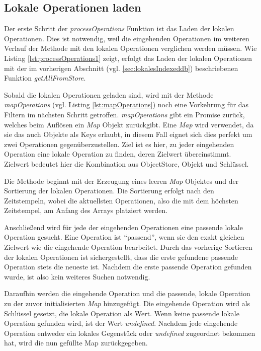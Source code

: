 \documentclass[a4paper, 12pt]{scrreprt}
\begin{document}
\subsection{Lokale Operationen laden}

Der erste Schritt der \textit{processOperations} Funktion ist das Laden der lokalen Operationen. Dies ist notwendig, weil die eingehenden Operationen im weiteren Verlauf der Methode mit den lokalen Operationen verglichen werden müssen. Wie Listing \ref{lst:processOperations1} zeigt, erfolgt das Laden der lokalen Operationen mit der im vorherigen Abschnitt (vgl. \ref{sec:lokalesIndexeddb}) beschriebenen Funktion \textit{getAllFromStore}.

\begin{minipage}{\linewidth}
	
\end{minipage}

Sobald die lokalen Operationen geladen sind, wird mit der Methode \textit{mapOperations} (vgl. Listing \ref{lst:mapOperations}) noch eine Vorkehrung für das Filtern im nächsten Schritt getroffen. \textit{mapOperations} gibt ein Promise zurück, welches beim Auflösen ein \textit{Map} Objekt zurückgibt. Eine \textit{Map} wird verwendet, da sie das auch Objekte als Keys erlaubt, in diesem Fall eignet sich dies perfekt um zwei Operationen gegenüberzustellen. Ziel ist es hier, zu jeder eingehenden Operation eine lokale Operation zu finden, deren Zielwert übereinstimmt. Zielwert bedeutet hier die Kombination aus ObjectStore, Objekt und Schlüssel. 

Die Methode beginnt mit der Erzeugung eines leeren \textit{Map} Objektes und der Sortierung der lokalen Operationen. Die Sortierung erfolgt nach den Zeitstempeln, wobei die aktuellsten Operationen, also die mit dem höchsten Zeitstempel, am Anfang des Arrays platziert werden. 

Anschließend wird für jede der eingehenden Operationen eine passende lokale Operation gesucht. Eine Operation ist \enquote{passend}, wenn sie den exakt gleichen Zielwert wie die eingehende Operation bearbeitet. Durch das vorherige Sortieren der lokalen Operationen ist sichergestellt, dass die erste gefundene passende Operation stets die neueste ist. Nachdem die erste passende Operation gefunden wurde, ist also kein weiteres Suchen notwendig.

Daraufhin werden die eingehende Operation und die passende, lokale Operation zu der zuvor initialisierten \textit{Map} hinzugefügt. Die eingehende Operation wird als Schlüssel gesetzt, die lokale Operation als Wert. Wenn keine passende lokale Operation gefunden wird, ist der Wert \textit{undefined}. Nachdem jede eingehende Operation entweder ein lokales Gegenstück oder \textit{undefined} zugeordnet bekommen hat, wird die nun gefüllte Map zurückgegeben. 
\end{document}
